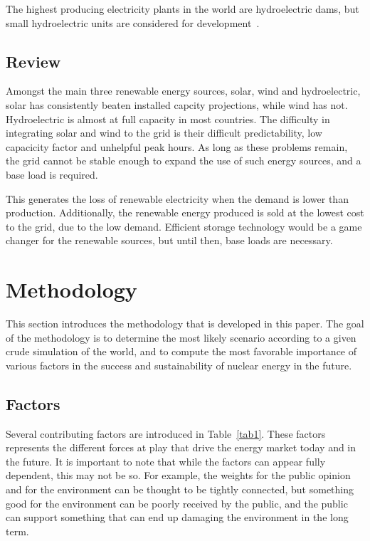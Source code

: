 \documentclass[IJPHM, 2017, 29]{PHMSociety}
\begin{document}
The highest producing electricity plants in the world are hydroelectric dams, but small hydroelectric units are considered for development~\citep{hydro_small}.


\subsection{Review}

Amongst the main three renewable energy sources, solar, wind and hydroelectric, solar has consistently beaten installed capcity projections, while wind has not. Hydroelectric is almost at full capacity in most countries. The difficulty in integrating solar and wind to the grid is their difficult predictability, low capacicity factor and unhelpful peak hours. As long as these problems remain, the grid cannot be stable enough to expand the use of such energy sources, and a base load is required.

This generates the loss of renewable electricity when the demand is lower than production. Additionally, the renewable energy produced is sold at the lowest cost to the grid, due to the low demand. Efficient storage technology would be a game changer for the renewable sources, but until then, base loads are necessary.


\section{Methodology}
\label{sec:meth}

This section introduces the methodology that is developed in this paper. The goal of the methodology is to determine the most likely scenario according to a given crude simulation of the world, and to compute the most favorable importance of various factors in the success and sustainability of nuclear energy in the future.

\subsection{Factors}

Several contributing factors are introduced in Table~\ref{tab1}. These factors represents the different forces at play that drive the energy market today and in the future. It is important to note that while the factors can appear fully dependent, this may not be so. For example, the weights for the public opinion and for the environment can be thought to be tightly connected, but something good for the environment can be poorly received by the public, and the public can support something that can end up damaging the environment in the long term.
\end{document}
